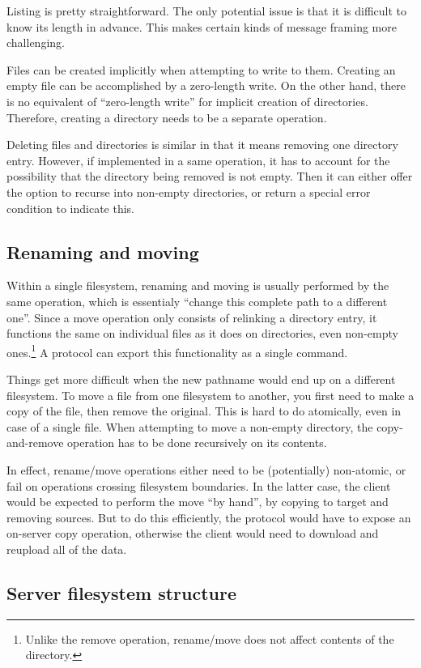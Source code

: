 Listing is pretty straightforward. The only potential issue is that it is difficult to know its length in
advance. This makes certain kinds of message framing more challenging.

Files can be created implicitly when attempting to write to them. Creating an empty file can be accomplished
by a zero-length write. On the other hand, there is no equivalent of ``zero-length write'' for implicit
creation of directories. Therefore, creating a directory needs to be a separate operation.

Deleting files and directories is similar in that it means removing one directory entry. However, if
implemented in a same operation, it has to account for the possibility that the directory being removed is not
empty. Then it can either offer the option to recurse into non-empty directories, or return a special error
condition to indicate this.

\subsection{Renaming and moving}

Within a single filesystem, renaming and moving is usually performed by the same operation, which is
essentialy ``change this complete path to a different one''. Since a move operation only consists of relinking
a directory entry, it functions the same on individual files as it does on directories, even non-empty
ones.\footnote{Unlike the remove operation, rename/move does not affect contents of the directory.} A protocol
can export this functionality as a single command.

Things get more difficult when the new pathname would end up on a different filesystem. To move a file from
one filesystem to another, you first need to make a copy of the file, then remove the original.  This is hard
to do atomically, even in case of a single file. When attempting to move a non-empty directory, the
copy-and-remove operation has to be done recursively on its contents.

In effect, rename/move operations either need to be (potentially) non-atomic, or fail on operations crossing
filesystem boundaries. In the latter case, the client would be expected to perform the move ``by hand'', by
copying to target and removing sources. But to do this efficiently, the protocol would have to expose an
on-server copy operation, otherwise the client would need to download and reupload all of the data.

\subsection{Server filesystem structure}

